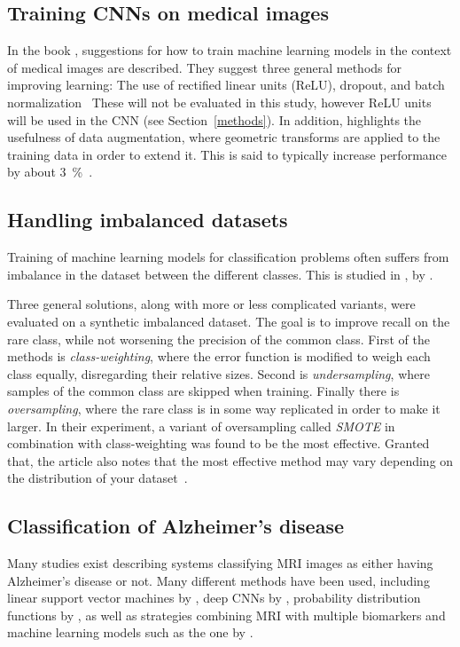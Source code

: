 \documentclass{kththesis}
\begin{document}
\subsection{Training CNNs on medical images}
In the book , suggestions for how to train machine learning models in the context of medical images are described. They suggest three general methods for improving learning: The use of rectified linear units (ReLU), dropout, and batch normalization~\cite[p. 20-22]{deepmedical} These will not be evaluated in this study, however ReLU units will be used in the CNN (see Section~\ref{methods}).
In addition,  highlights the usefulness of data augmentation, where geometric transforms are applied to the training data in order to extend it. This is said to typically increase performance by about 3~\%~\cite[p. 31]{deepmedical}.

\subsection{Handling imbalanced datasets}
Training of machine learning models for classification problems often suffers from imbalance in the dataset between the different classes. This is studied in , by \textcite{more2016survey}.

Three general solutions, along with more or less complicated variants, were evaluated on a synthetic imbalanced dataset. The goal is to improve recall on the rare class, while not worsening the precision of the common class. First of the methods is \textit{class-weighting}, where the error function is modified to weigh each class equally, disregarding their relative sizes. Second is \textit{undersampling}, where samples of the common class are skipped when training. Finally there is \textit{oversampling}, where the rare class is in some way replicated in order to make it larger. In their experiment, a variant of oversampling called \textit{SMOTE} in combination with class-weighting was found to be the most effective. Granted that, the article also notes that the most effective method may vary depending on the distribution of your dataset~\cite{more2016survey}.

\subsection{Classification of Alzheimer's disease}
Many studies exist describing systems classifying MRI images as either having Alzheimer's disease or not. Many different methods have been used, including linear support vector machines by \textcite{cuingnet2011automatic}, deep CNNs by \textcite{sarraf070441}, probability distribution functions by \textcite{beheshti2015probability}, as well as strategies combining MRI with multiple biomarkers and machine learning models such as the one by \textcite{zhang2011multimodal}.
\end{document}
